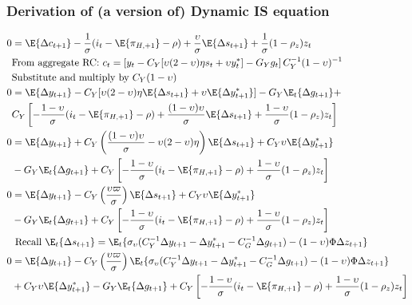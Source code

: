 \subsubsection{Derivation of (a version of) Dynamic IS equation}
\begin{align}\label{eq:dynamic_is_beginning}
    0 &= \E \{ \Delta c_{t+1}\} - \frac{1}{\sigma}(i_t - \E \{ \pi_{H,+1}\} - \rho) + \frac{\upsilon}{\sigma}\E \{ \Delta s_{t+1} \} + \frac{1}{\sigma}(1-\rho_z)z_t \\
    &\text{From aggregate RC: $c_t = \left[ y_t - C_Y[\upsilon(2-\upsilon)\eta s_t + \upsilon y_t^*] - G_Y g_t\right] C_Y^{-1}(1-\upsilon)^{-1}$} \nonumber\\
    &\text{Substitute and multiply by $C_Y(1-\upsilon)$}\nonumber\\
    0  &= \E \{ \Delta y_{t+1}\}  - C_Y[\upsilon(2-\upsilon)\eta \E \{\Delta s_{t+1} \} + \upsilon \E \{\Delta y_{t+1}^* \}] -G_Y \E_t\{\Delta g_{t+1}\} + \nonumber\\ 
    &C_Y\left[- \frac{1-\upsilon}{\sigma}(i_t - \E \{ \pi_{H,+1}\} - \rho) + \frac{(1-\upsilon)\upsilon}{\sigma}\E \{ \Delta s_{t+1} \} + \frac{1-\upsilon}{\sigma}(1-\rho_z)z_t \right] \\
    0  &= \E \{ \Delta y_{t+1}\}  + C_Y\left(\frac{(1-\upsilon)\upsilon}{\sigma} - \upsilon(2-\upsilon)\eta\right) \E \{\Delta s_{t+1} \} + C_Y \upsilon \E \{\Delta y_{t+1}^* \} \nonumber\\ 
    &-G_Y \E_t\{\Delta g_{t+1}\} + C_Y\left[- \frac{1-\upsilon}{\sigma}(i_t - \E \{ \pi_{H,+1}\} - \rho)  + \frac{1-\upsilon}{\sigma}(1-\rho_z)z_t \right] \\
    0  &= \E \{ \Delta y_{t+1}\}  - C_Y\left(\frac{\upsilon \varpi}{\sigma}\right) \E \{\Delta s_{t+1} \} + C_Y \upsilon \E \{\Delta y_{t+1}^* \} \nonumber\\
     &-G_Y \E_t\{\Delta g_{t+1}\} + C_Y\left[- \frac{1-\upsilon}{\sigma}(i_t - \E \{ \pi_{H,+1}\} - \rho)  + \frac{1-\upsilon}{\sigma}(1-\rho_z)z_t \right] \\
     &\text{ Recall $\E_t \{ \Delta s_{t+1}\} = \E_t\{\sigma_\upsilon(C_Y^{-1} \Delta y_{t+1} - \Delta y^*_{t+1} - C_G^{-1} \Delta g_{t+1}) - (1-\upsilon)\Phi \Delta z_{t+1}\}$}\nonumber\\
    0 &= \E \{ \Delta y_{t+1}\}  - C_Y\left(\frac{\upsilon \varpi}{\sigma}\right) \E_t\{\sigma_\upsilon(C_Y^{-1} \Delta y_{t+1} - \Delta y^*_{t+1} - C_G^{-1} \Delta g_{t+1}) - (1-\upsilon)\Phi \Delta z_{t+1}\} \nonumber \\ 
    &+ C_Y \upsilon \E \{\Delta y_{t+1}^* \} -G_Y \E_t\{\Delta g_{t+1}\} + C_Y\left[- \frac{1-\upsilon}{\sigma}(i_t - \E \{ \pi_{H,+1}\} - \rho)  + \frac{1-\upsilon}{\sigma}(1-\rho_z)z_t \right] \\

\end{align}
